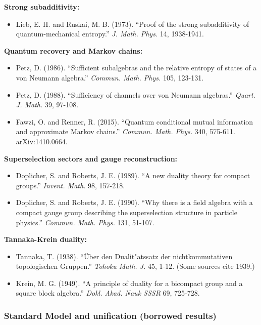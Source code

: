 \documentclass[11pt,a4paper]{article}
\theoremstyle{remark}
\providecommand{\tightlist}{%
  \setlength{\itemsep}{0pt}\setlength{\parskip}{0pt}}
\begin{document}
\textbf{Strong subadditivity:}

\begin{itemize}
\tightlist
\item
  Lieb, E. H. and Ruskai, M. B. (1973). ``Proof of the strong subadditivity of
  quantum-mechanical entropy.'' \emph{J. Math. Phys.} 14, 1938-1941.
\end{itemize}

\textbf{Quantum recovery and Markov chains:}

\begin{itemize}
\tightlist
\item
  Petz, D. (1986). ``Sufficient subalgebras and the relative entropy of states
  of a von Neumann algebra.'' \emph{Commun. Math. Phys.} 105, 123-131.
\item
  Petz, D. (1988). ``Sufficiency of channels over von Neumann algebras.''
  \emph{Quart. J. Math.} 39, 97-108.
\item
  Fawzi, O. and Renner, R. (2015). ``Quantum conditional mutual information
  and approximate Markov chains.'' \emph{Commun. Math. Phys.} 340, 575-611.
  arXiv:1410.0664.
\end{itemize}

\textbf{Superselection sectors and gauge reconstruction:}

\begin{itemize}
\tightlist
\item
  Doplicher, S. and Roberts, J. E. (1989). ``A new duality theory for compact
  groups.'' \emph{Invent. Math.} 98, 157-218.
\item
  Doplicher, S. and Roberts, J. E. (1990). ``Why there is a field algebra with
  a compact gauge group describing the superselection structure in particle
  physics.'' \emph{Commun. Math. Phys.} 131, 51-107.
\end{itemize}

\textbf{Tannaka-Krein duality:}

\begin{itemize}
\tightlist
\item
  Tannaka, T. (1938). ``Über den Dualit"atssatz der nichtkommutativen
  topologischen Gruppen.'' \emph{Tohoku Math. J.} 45, 1-12. (Some sources cite 1939.)
\item
  Krein, M. G. (1949). ``A principle of duality for a bicompact group and a
  square block algebra.'' \emph{Dokl. Akad. Nauk SSSR} 69, 725-728.
\end{itemize}

\subsubsection{Standard Model and unification (borrowed results)}\label{standard-model-and-unification-borrowed-results}
\end{document}
